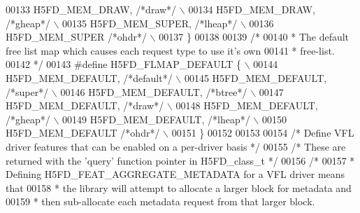 \begin{DoxyCode}
00133 \textcolor{preprocessor}{    H5FD\_MEM\_DRAW,          }\textcolor{comment}{/*draw*/}\textcolor{preprocessor}{                  \(\backslash\)}
00134 \textcolor{preprocessor}{    H5FD\_MEM\_DRAW,          }\textcolor{comment}{/*gheap*/}\textcolor{preprocessor}{                 \(\backslash\)}
00135 \textcolor{preprocessor}{    H5FD\_MEM\_SUPER,         }\textcolor{comment}{/*lheap*/}\textcolor{preprocessor}{                 \(\backslash\)}
00136 \textcolor{preprocessor}{    H5FD\_MEM\_SUPER          }\textcolor{comment}{/*ohdr*/}\textcolor{preprocessor}{                  \(\backslash\)}
00137 \textcolor{preprocessor}{\}}
00138 
00139 \textcolor{comment}{/*}
00140 \textcolor{comment}{ * The default free list map which causes each request type to use it's own}
00141 \textcolor{comment}{ * free-list.}
00142 \textcolor{comment}{ */}
00143 \textcolor{preprocessor}{#define H5FD\_FLMAP\_DEFAULT \{                              \(\backslash\)}
00144 \textcolor{preprocessor}{    H5FD\_MEM\_DEFAULT,           }\textcolor{comment}{/*default*/}\textcolor{preprocessor}{               \(\backslash\)}
00145 \textcolor{preprocessor}{    H5FD\_MEM\_DEFAULT,           }\textcolor{comment}{/*super*/}\textcolor{preprocessor}{                 \(\backslash\)}
00146 \textcolor{preprocessor}{    H5FD\_MEM\_DEFAULT,           }\textcolor{comment}{/*btree*/}\textcolor{preprocessor}{                 \(\backslash\)}
00147 \textcolor{preprocessor}{    H5FD\_MEM\_DEFAULT,           }\textcolor{comment}{/*draw*/}\textcolor{preprocessor}{                  \(\backslash\)}
00148 \textcolor{preprocessor}{    H5FD\_MEM\_DEFAULT,           }\textcolor{comment}{/*gheap*/}\textcolor{preprocessor}{                 \(\backslash\)}
00149 \textcolor{preprocessor}{    H5FD\_MEM\_DEFAULT,           }\textcolor{comment}{/*lheap*/}\textcolor{preprocessor}{                 \(\backslash\)}
00150 \textcolor{preprocessor}{    H5FD\_MEM\_DEFAULT            }\textcolor{comment}{/*ohdr*/}\textcolor{preprocessor}{                  \(\backslash\)}
00151 \textcolor{preprocessor}{\}}
00152 
00153 
00154 \textcolor{comment}{/* Define VFL driver features that can be enabled on a per-driver basis */}
00155 \textcolor{comment}{/* These are returned with the 'query' function pointer in H5FD\_class\_t */}
00156     \textcolor{comment}{/*}
00157 \textcolor{comment}{     * Defining H5FD\_FEAT\_AGGREGATE\_METADATA for a VFL driver means that}
00158 \textcolor{comment}{     * the library will attempt to allocate a larger block for metadata and}
00159 \textcolor{comment}{     * then sub-allocate each metadata request from that larger block.}

\end{DoxyCode}

